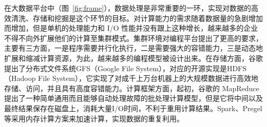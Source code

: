 \par 在大数据平台中（图~\ref{fig:frame}），数据处理是非常重要的一环，实现对数据的高效清洗、存储和挖掘是这个环节的目标。对计算能力的需求随着数据量的急剧增加而增加，但是单机的处理能力和 I/O 性能并没有跟上这种增长，越来越多的企业不得不向外扩展他们的计算至集群模式\cite{Zaharia:2016:AFG:3002856}。集群环境对编程平台提出了更高的要求，主要有三方面，一是程序需要并行化执行，二是需要强大的容错能力，三是动态地扩展和缩减计算资源，为此，越来越多的编程模型被设计出来。在存储方面，谷歌提出了分布式文件系统GFS（Google File System）\cite{51}，对应的开源实现是HDFS（Hadoop File System）\cite{hdfs}，它实现了对成千上万台机器上的大规模数据进行高效地存储、访问，并且具有高度容错能力。计算框架方面，起初，谷歌的 MapReduce\cite{dean2008mapreduce}提出了一种简单通用而且能够自动处理故障的批处理计算模型，但是它将中间以及最终结果保存在磁盘上，消耗大量I/O时间，不利于重用计算结果。Spark\cite{Zaharia:2016:AFG:3002856}、Pregel\cite{malewicz2010pregel}等采用内存计算方案来加速计算，实现数据的重复利用。

